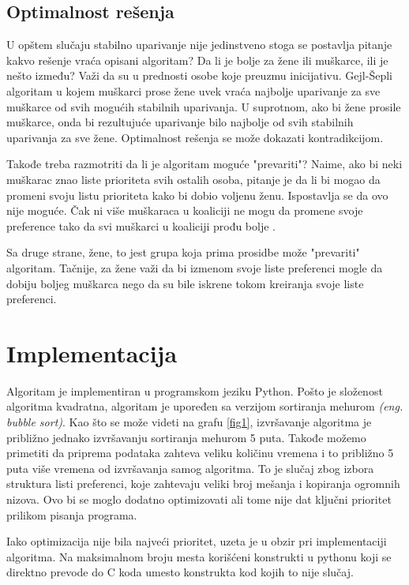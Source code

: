 \documentclass[a4paper]{article}
\begin{document}
\subsection{Optimalnost rešenja}
U opštem slučaju stabilno uparivanje nije jedinstveno stoga se postavlja pitanje kakvo rešenje vraća opisani algoritam? Da li je bolje za žene ili muškarce, ili je nešto između? Važi da su u prednosti osobe koje preuzmu inicijativu. Gejl-Šepli algoritam u kojem muškarci prose žene uvek vraća najbolje uparivanje za sve muškarce od svih mogućih stabilnih uparivanja. U suprotnom, ako bi žene prosile muškarce, onda bi rezultujuće uparivanje bilo najbolje od svih stabilnih uparivanja za sve žene. Optimalnost rešenja se može dokazati kontradikcijom.

Takođe treba razmotriti da li je algoritam moguće "prevariti"? Naime, ako bi neki muškarac znao liste prioriteta svih ostalih osoba, pitanje je da li bi mogao da promeni svoju listu prioriteta kako bi dobio voljenu ženu. Ispostavlja se da ovo nije moguće. Čak ni više muškaraca u koaliciji ne mogu da promene svoje preference tako da svi muškarci u koaliciji prođu bolje \cite{prevara}.

Sa druge strane, žene, to jest grupa koja prima prosidbe može "prevariti" algoritam. Tačnije, za žene važi da bi izmenom svoje liste preferenci mogle da dobiju boljeg muškarca nego da su bile iskrene tokom kreiranja svoje liste preferenci. 

\section{Implementacija}

Algoritam je implementiran u programskom jeziku Python. Pošto je složenost algoritma kvadratna, algoritam je upoređen sa verzijom sortiranja mehurom \textit{(eng. bubble sort)}. Kao što se može videti na grafu \ref{fig1}, izvršavanje algoritma je približno jednako izvršavanju sortiranja mehurom 5 puta. Takođe možemo primetiti da priprema podataka zahteva veliku količinu vremena i to približno 5 puta više vremena od izvršavanja samog algoritma. To je slučaj zbog izbora struktura listi preferenci, koje zahtevaju veliki broj mešanja i kopiranja ogromnih nizova. Ovo bi se moglo dodatno optimizovati ali tome nije dat ključni prioritet prilikom pisanja programa. 

Iako optimizacija nije bila najveći prioritet, uzeta je u obzir pri implementaciji algoritma. Na maksimalnom broju mesta korišćeni konstrukti u pythonu koji se direktno prevode do C koda umesto konstrukta kod kojih to nije slučaj. 
\end{document}
